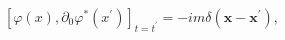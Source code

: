 \begin{equation}
\left[ \varphi (x),\partial_0 \varphi^{*}(x^{\prime })\right]
_{t=t^{\prime }}=-im\delta (\mathbf{x}-\mathbf{x}^{\prime }) ,
\label{85}
\end{equation}

